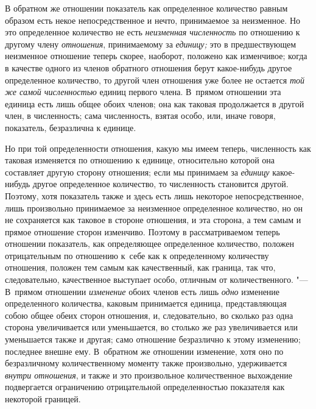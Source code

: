В обратном же отношении показатель как определенное количество равным образом
есть некое непосредственное и нечто, принимаемое за неизменное. Но это
определенное количество не есть {\em неизменная численность} по отношению к
другому члену {\em отношения}, принимаемому за {\em единицу;} это в
предшествующем неизменное отношение теперь скорее, наоборот, положено как
изменчивое; когда в качестве одного из членов обратного отношения берут
какое-нибудь другое определенное количество, то другой член отношения уже более
не остается {\em той же самой численностью} единиц первого члена. В~прямом
отношении эта единица есть лишь общее обоих членов; она как таковая
продолжается в другой член, в численность; сама численность, взятая особо, или,
иначе говоря, показатель, безразлична к единице.

Но при той определенности отношения, какую мы имеем теперь, численность как
таковая изменяется по отношению к единице, относительно которой она составляет
другую сторону отношения; если мы принимаем за {\em единицу} какое-нибудь
другое определенное количество, то численность становится другой. Поэтому, хотя
показатель также и здесь есть лишь некоторое непосредственное, лишь произвольно
принимаемое за неизменное определенное количество, но он не сохраняется как
таковое в стороне отношения, и эта сторона, а тем самым и прямое отношение
сторон изменчиво. Поэтому в рассматриваемом теперь отношении показатель, как
определяющее определенное количество, положен отрицательным по отношению к~себе
как к определенному количеству отношения, положен тем самым как качественный,
как граница, так что, следовательно, качественное выступает особо, отличным от
количественного. "--- В~прямом отношении {\em изменение} обоих членов есть лишь
{\em одно} изменение определенного количества, каковым принимается единица,
представляющая собою общее обеих сторон отношения, и, следовательно, во сколько
раз одна сторона увеличивается или уменьшается, во столько же раз увеличивается
или уменьшается также и другая; само отношение безразлично к этому изменению;
последнее внешне ему. В~обратном же отношении изменение, хотя оно по
безразличному количественному моменту также произвольно, удерживается
{\em внутри отношения}, и также и это произвольное количественное выхождение
подвергается ограничению отрицательной определенностью показателя как
некоторой границей.

